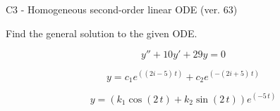\begin{exercise}
  \begin{exerciseTitle}C3 - Homogeneous second-order linear ODE (ver. 63)\end{exerciseTitle}
  \begin{exerciseStatement}
    
Find the general solution to the given ODE.

    
\[y''+10y'+29y = 0\]

  \end{exerciseStatement}
  \begin{exerciseAnswer}
    
\[y= c_{1} e^{\left(\left(2 i - 5\right) \, t\right)} + c_{2} e^{\left(-\left(2 i + 5\right) \, t\right)}\]

    
\[y= {\left(k_{1} \cos\left(2 \, t\right) + k_{2} \sin\left(2 \, t\right)\right)} e^{\left(-5 \, t\right)}\]

  \end{exerciseAnswer}
\end{exercise}